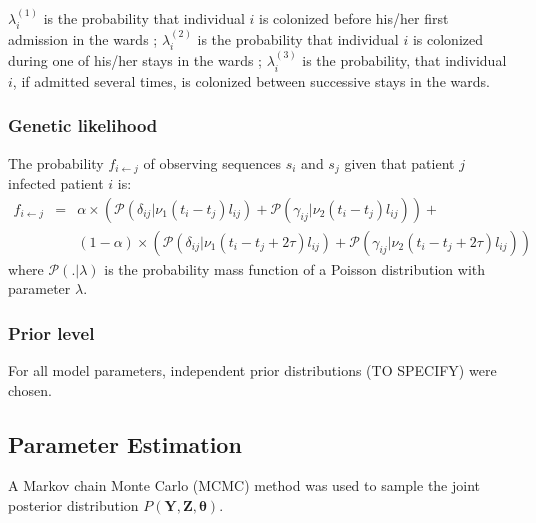 \documentclass[10pt]{article}
\begin{document}
\bigskip

$\lambda_i^{\left(1\right)}$ is the probability that individual $i$ is colonized before his/her first admission in the wards ; $\lambda_i^{\left(2\right)}$ is the probability that individual $i$ is colonized during one of his/her stays in the wards ; $\lambda_i^{\left(3\right)}$ is the probability, that individual $i$, if admitted several times, is colonized between successive stays in the wards.





\subsubsection*{Genetic likelihood}


The probability $f_{i \leftarrow j}$ of observing sequences $s_i$ and $s_j$ given that patient $j$ infected patient $i$ is:
\begin{eqnarray*}
f_{i \leftarrow j} & = & \alpha \times \left( \mathcal{P}(\delta_{ij} | \nu_1 (t_i-t_j) l_{ij}) 
  + \mathcal{P}(\gamma_{ij} | \nu_2 (t_i-t_j) l_{ij}) \right) + \\
& & (1-\alpha) \times \left( \mathcal{P}(\delta_{ij} | \nu_1 (t_i-t_j + 2\tau) l_{ij}) + \mathcal{P}(\gamma_{ij} | \nu_2 (t_i-t_j+ 2\tau) l_{ij}) \right)
\end{eqnarray*}
where $\mathcal{P}(.|\lambda)$ is the probability mass function of a Poisson distribution with parameter $\lambda$.





\subsubsection*{Prior level}


For all model parameters, independent prior distributions (TO SPECIFY) were chosen. 
  
\subsection*{Parameter Estimation}

A Markov chain Monte Carlo (MCMC) method was used to sample the joint
posterior distribution $P\left(\bm{Y},\bm{Z},\bm{\theta}\right)$.
\end{document}
